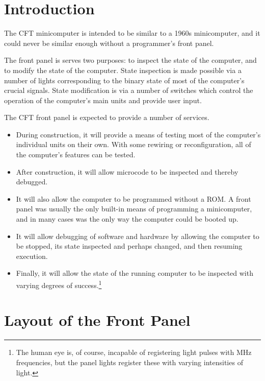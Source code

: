 \documentclass[11pt,a4paper,twocolumns]{article}
\begin{document}
\section{Introduction}

The CFT minicomputer is intended to be similar to a 1960s
minicomputer, and it could never be similar enough without a
programmer's front panel.

The front panel is serves two purposes: to inspect the state of the
computer, and to modify the state of the computer. State inspection is
made possible via a number of lights corresponding to the binary state
of most of the computer's crucial signals. State modification is via a
number of switches which control the operation of the computer's main
units and provide user input.

The CFT front panel is expected to provide a number of services.

\begin{itemize}
\item During construction, it will provide a means of testing most of
  the computer's individual units on their own. With some rewiring or
  reconfiguration, all of the computer's features can be tested.

\item After construction, it will allow microcode to be inspected and
  thereby debugged.

\item It will also allow the computer to be programmed without a
  ROM. A front panel was usually the only built-in means of
  programming a minicomputer, and in many cases was the only way the
  computer could be booted up.

\item It will allow debugging of software and hardware by allowing the
  computer to be stopped, its state inspected and perhaps changed, and
  then resuming execution.

\item Finally, it will allow the state of the running computer to be
  inspected with varying degrees of success.\footnote{The human eye
    is, of course, incapable of registering light pulses with MHz
    frequencies, but the panel lights register these with varying
    intensities of light.}

\end{itemize}

\section{Layout of the Front Panel}
\end{document}
